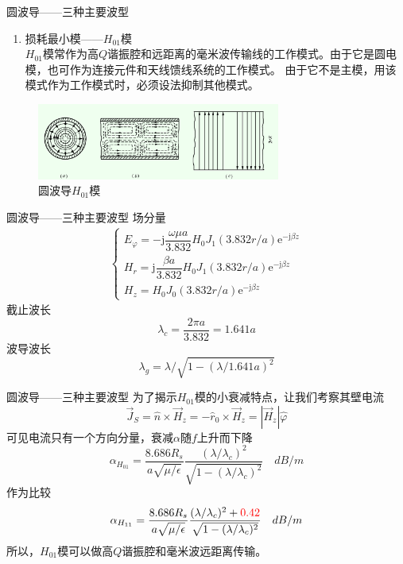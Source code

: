 \begin{frame}{圆波导——三种主要波型}
    \begin{enumerate}
        \resume
        \item 损耗最小模——$H_{01}$模\\
              $H_{01}$模常作为高$Q$谐振腔和远距离的毫米波传输线的工作模式。由于它是圆电模，也可作为连接元件和天线馈线系统的工作模式。
              由于它不是主模，用该模式作为工作模式时，必须设法抑制其他模式。
              \saveenum
    \end{enumerate}
    \begin{figure}
        \includegraphics[width=8cm]{Cha6//fig6-25.png}
        \caption{圆波导$H_{01}$模}
    \end{figure}
\end{frame}

\begin{frame}{圆波导——三种主要波型}
    场分量
    \begin{align*}
        \begin{cases}
            E_{\varphi}=-\mathrm{j}\dfrac{\omega\mu a}{3.832}H_0J_1(3.832r/a)\mathrm{e}^{-\mathrm{j}\beta z} \\
            H_r=\mathrm{j}\dfrac{\beta a}{3.832}H_0J_1(3.832r/a)\mathrm{e}^{-\mathrm{j}\beta z}              \\
            H_z=H_0J_0(3.832r/a)\mathrm{e}^{-\mathrm{j}\beta z}
        \end{cases}
    \end{align*}
    截止波长
    $$\lambda_c=\frac{2\pi a}{3.832}=1.641a$$
    波导波长
    $$\lambda_g=\lambda/\sqrt{1-(\lambda/1.641a)^2}$$
\end{frame}

\begin{frame}{圆波导——三种主要波型}
    为了揭示$H_{01}$模的小衰减特点，让我们考察其壁电流
    $$\vec{J}_S=\hat{n}\times\vec{H}_z=-\hat{r}_0\times\vec{H}_z=\left\lvert\vec{H}_z\right\rvert\hat{\varphi} $$
    可见电流只有一个方向分量，衰减$\alpha$随$f$上升而下降
    $$\alpha_{H_{01}}=\frac{8.686R_s}{a\sqrt{\mu/\epsilon}}\frac{(\lambda/\lambda_c)^2}{\sqrt{1-(\lambda/\lambda_c)^2}}\quad dB/m$$
    作为比较
    $$\alpha_{H_{11}}=\frac{8.686R_s}{a\sqrt{\mu/\epsilon}}\frac{(\lambda/\lambda_c)^2+\color{red}{0.42}}{\sqrt{1-(\lambda/\lambda_c)^2}}\quad dB/m$$
    所以，$H_{01}$模可以做高$Q$谐振腔和毫米波远距离传输。
\end{frame}


